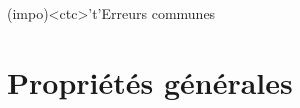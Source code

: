 \documentclass[../../main/main.tex]{subfiles}
\begin{document}
\begin{tcn}[sidebyside, fontupper=\small, fontlower=\small]
	\begin{tcn}(impo)<ctc>'t'{Erreurs communes}
	\end{tcn}
\end{tcn}

\vspace*{\fill}

\newpage

\section{Propriétés générales}
\end{document}
